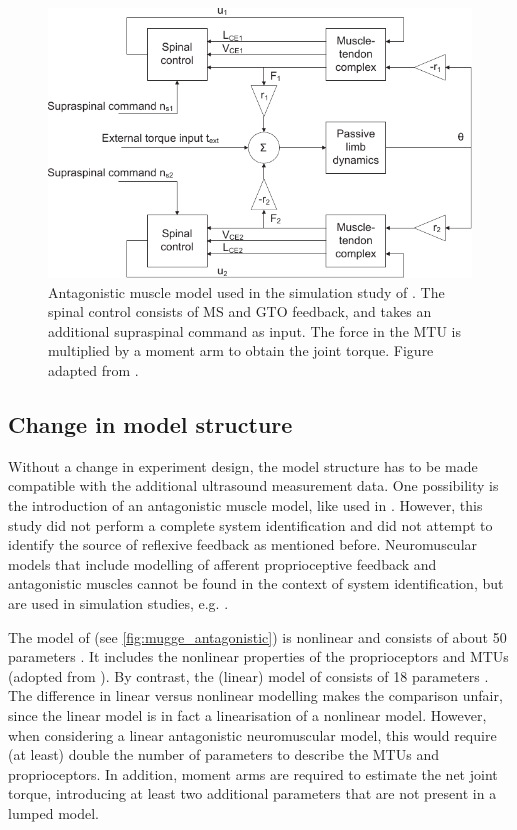 \begin{figure}[!b]
	\centering
	\includegraphics[width=.8\linewidth]{Figures/elastography/mugge_antagonistic.pdf}
	\caption{Antagonistic muscle model used in the simulation study of \citeauthor{mugge_modeling_2012}. The spinal control consists of MS and GTO feedback, and takes an additional supraspinal command as input. The force in the MTU is multiplied by a moment arm to obtain the joint torque. Figure adapted from \citet{mugge_modeling_2012}.}
	\label{fig:mugge_antagonistic}
\end{figure}


\subsection{Change in model structure}
Without a change in experiment design, the model structure has to be made compatible with the additional ultrasound measurement data. One possibility is the introduction of an antagonistic muscle model, like used in \cite{de_gooijer-van_de_groep_estimation_2016}. However, this study did not perform a complete system identification and did not attempt to identify the source of reflexive feedback as mentioned before. Neuromuscular models that include modelling of afferent proprioceptive feedback and antagonistic muscles cannot be found in the context of system identification, but are used in simulation studies, e.g. \cite{munts_fixed_2011, mugge_modeling_2012}. 

The model of \citeauthor{mugge_modeling_2012} (see \autoref{fig:mugge_antagonistic}) is nonlinear and consists of about 50 parameters \cite{mugge_modeling_2012}. It includes the nonlinear properties of the proprioceptors and MTUs (adopted from \cite{winters_analysis_1985, stroeve_neuromuscular_1998}). By contrast, the (linear) model of \citeauthor{schouten_nmclab_2008} consists of 18 parameters \cite{schouten_nmclab_2008}. The difference in linear versus nonlinear modelling makes the comparison unfair, since the linear model is in fact a linearisation of a nonlinear model. However, when considering a linear antagonistic neuromuscular model, this would require (at least) double the number of parameters to describe the MTUs and proprioceptors. In addition, moment arms are required to estimate the net joint torque, introducing at least two additional parameters that are not present in a lumped model. 

